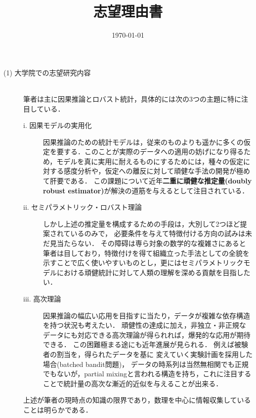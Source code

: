\documentclass[uplatex, dvipdfmx]{jsarticle}
\title{志望理由書}
\date{\today}
\begin{document}
\begin{description}
    \item[(1) 大学院での志望研究内容] \mbox{}\\
    筆者は主に因果推論とロバスト統計，具体的には次の3つの主題に特に注目している．
    \vspace{1em}
    \begin{description}
        \item[i. 因果モデルの実用化] 因果推論のための統計モデルは，従来のものよりも遥かに多くの仮定を要する．このことが実際のデータへの適用の妨げになり得るため，モデルを真に実用に耐えるものにするためには，種々の仮定に対する感度分析や，仮定への離反に対して頑健な手法の開発が極めて肝要である．
        この課題について近年\textbf{二重に頑健な推定量(doubly robust estimator)}が解決の道筋を与えるとして注目されている\cite{Robins-Rotnitzky01-Comments}．
        \vspace{1em}\item[ii. セミパラメトリック・ロバスト理論] しかし上述の推定量を構成するための手段は，大別して2つほど提案されているのみ\cite{Rotnitzky-Smucler-Robins21-MixedBiasProperty}で，
        必要条件を与えて特徴付ける方向の試みは未だ見当たらない．
        その障碍は専ら対象の数学的な複雑さにあると筆者は目しており，特徴付けを得て組織立った手法としての全貌を示すことで広く使いやすいものとし，更にはセミパラメトリックモデルにおける頑健統計に対して人類の理解を深める貢献を目指したい．
        \vspace{1em}\item[iii. 高次理論] 因果推論の幅広い応用を目指すに当たり，データが複雑な依存構造を持つ状況も考えたい．
        頑健性の達成に加え，非独立・非正規なデータにも対応できる高次理論が得られれば，爆発的な応用が期待できる．
        この困難極まる途にも近年進展が見られる\cite{Robins-Li-Tchetgen-vanderVaart08-HigherOrder}．
        例えば被験者の割当を，得られたデータを基に%
        変えていく実験計画を採用した場合(batched bandit問題)，
        データの時系列は当然無相関でも正規でもないが，partial mixingと言われる構造を持ち，これに注目することで統計量の高次な漸近的近似を与えることが出来る\cite{YechanPark-Zhan-Yoshida22}．
    \end{description}
    \vspace{1em}
    上述が筆者の現時点の知識の限界であり，数理を中心に情報収集していることは明らかである．

\end{description}
\end{document}
